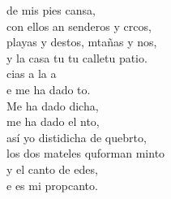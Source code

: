 \begin{cancion}
	de mis pies cansa,\\
	con ellos an senderos y crcos,\\
	playas y destos, mtañas y nos,\\
	y la casa tu tu calletu patio.\\
	cias a la a \\
	e me ha dado to.\\
	Me ha dado dicha, \\
	me ha dado el nto,\\
	así yo distidicha de quebrto,\\
	los dos mateles quforman minto\\
	y el canto de edes, \\
	e es mi propcanto.\\
\end{cancion}%

